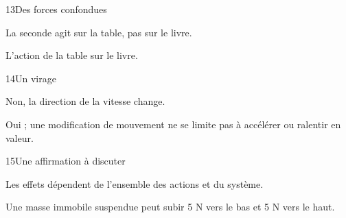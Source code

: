 \par\noindent\begin{minipage}{\linewidth}
\begin{corrige}{13}{Des forces confondues}
\begin{questions}
\item La seconde agit sur la table, pas sur le livre.
\item L’action de la table sur le livre.
\end{questions}
\end{corrige}
\end{minipage}
\par\noindent\begin{minipage}{\linewidth}
\begin{corrige}{14}{Un virage}
\begin{questions}
\item Non, la direction de la vitesse change.
\item Oui ; une modification de mouvement ne se limite pas à accélérer ou ralentir en valeur.
\end{questions}
\end{corrige}
\end{minipage}
\par\noindent\begin{minipage}{\linewidth}
\begin{corrige}{15}{Une affirmation à discuter}
\begin{questions}
\item Les effets dépendent de l’ensemble des actions et du système.
\item Une masse immobile suspendue peut subir 5 N vers le bas et 5 N vers le haut.
\end{questions}
\end{corrige}
\end{minipage}
